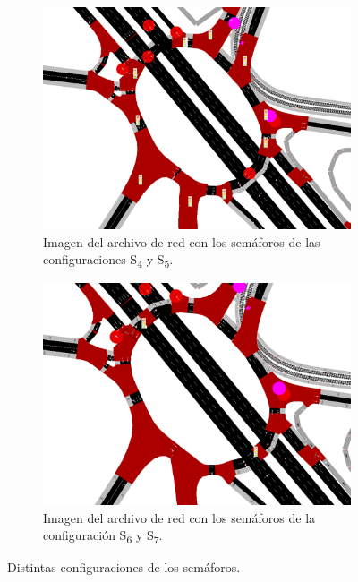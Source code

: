 \begin{figure}[ht]
    \centering
    \begin{subfigure}[t]{0.48\textwidth}
        \centering
        \includegraphics[width=\textwidth]{report/images/conf2.png}
        \caption{Imagen del archivo de red con los semáforos de las configuraciones S\textsubscript{4} y S\textsubscript{5}.}
        \label{fig:conf2}
    \end{subfigure}
    \hfill
    \begin{subfigure}[t]{0.48\textwidth}
        \centering
        \includegraphics[width=\textwidth]{report/images/conf3.png}
        \caption{Imagen del archivo de red con los semáforos de la configuración S\textsubscript{6} y S\textsubscript{7}.}
        \label{fig:conf3}
    \end{subfigure}
    \caption{Distintas configuraciones de los semáforos.}
    \label{fig:confs}
\end{figure}



